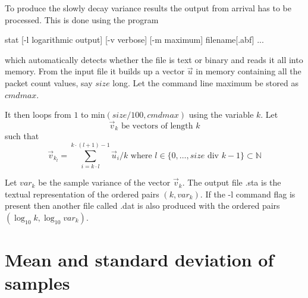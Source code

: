 To produce the slowly decay variance results the output from {\ttfamily
arrival} has to be processed.  This is done using the program

{\ttfamily \small \begin{flushleft}
  stat [-l logarithmic output] [-v verbose] [-m maximum] filename[.abf] ... \\
\end{flushleft}}
which automatically detects whether the file is text or binary and
reads it all into memory.  From the input file it builds up a vector
$\vec{u}$ in memory containing all the packet count values, say $size$
long.  Let the command line maximum be stored as $cmdmax$.

It then loops from $1$ to $\mbox{min}(size / 100, cmdmax)$ using the
variable $k$.  Let 
\[
\vec{v}_{k} \mbox{ be vectors of length } k
\]
 such that
\[
\vec{v}_{k_l} = \sum^{k \cdot (l+1) - 1}_{i = k \cdot l}{\vec{u}_i} / k
\mbox{ where } l \in \{0, \ldots, size \mbox{ div } k - 1\} \subset{\mathbb N}
\]

Let $var_k$ be the sample variance of the vector $\vec{v}_k$.  The
output file {.sta} is the textual representation of
the ordered pairs $(k, var_k)$.  If the {\ttfamily -l} command flag is
present then another file called {.dat} is also
produced with the ordered pairs $(\log_{10} k, \log_{10} var_k)$.

\section{Mean and standard deviation of samples}

